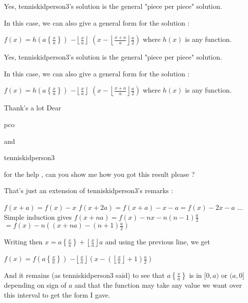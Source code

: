 \begin{solution}
	Yes, tenniskidperson3's solution is the general "piece per piece" solution.

In this case, we can also give a general form for the solution :

$f(x)=h\left(a\left\{\frac xa\right\}\right)$ $-\left\lfloor\frac xa\right\rfloor$ $\left(x-\left\lfloor\frac {x+a}a\right\rfloor\frac a2\right)$ where $h(x)$ is any function.
\end{solution}



\begin{solution}
	\begin{tcolorbox}Yes, tenniskidperson3's solution is the general "piece per piece" solution.

In this case, we can also give a general form for the solution :

$f(x)=h\left(a\left\{\frac xa\right\}\right)$ $-\left\lfloor\frac xa\right\rfloor$ $\left(x-\left\lfloor\frac {x+a}a\right\rfloor\frac a2\right)$ where $h(x)$ is any function.\end{tcolorbox}
Thank's a lot Dear \begin{bolded}pco \end{bolded} and \begin{bolded}tenniskidperson3\end{bolded} for the help , can you show me how you got this result please ?
\end{solution}



\begin{solution}
	That's just an extension of tenniskidperson3's remarks :

$f(x+a)=f(x)-x$
$f(x+2a)=f(x+a)-x-a=f(x)-2x-a$
...
Simple induction gives $f(x+na)=f(x)-nx-n(n-1)\frac a2$ $=f(x)-n((x+na)-(n+1)\frac a2)$

Writing then $x=a\left\{\frac xa\right\}+\left\lfloor\frac xa\right\rfloor a$ and using the previous line, we get 

$f(x)=f(a\left\{\frac xa\right\})$ $-\left\lfloor\frac xa\right\rfloor(x-(\left\lfloor\frac xa\right\rfloor+1)\frac a2)$

And it remains (as tenniskidperson3 said) to see that $a\left\{\frac xa\right\}$ is in $[0,a)$ or $(a,0]$ depending on sign of $a$ and that the function may take any value we want over this interval to get the form I gave.
\end{solution}



